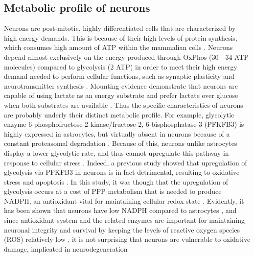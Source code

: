 \subsection{Metabolic profile of neurons}
Neurons are post-mitotic, highly differentiated cells that are characterized by high energy demands. This is because of their high levels of protein synthesis, which consumes high amount of ATP within the mammalian cells \citep{Buttgereit1995}. Neurons depend almost exclusively on the energy produced through OxPhos (30 - 34 ATP molecules) compared to glycolysis (2 ATP) in order to meet their high energy demand needed to perform cellular functions, such as synaptic plasticity and neurotransmitter synthesis \citep{Cenini2019,Mattson2008,Schonfeld2013}. Mounting evidence demonstrate that neurons are capable of using lactate as an energy substrate \citep{Boumezbeur2010,Bouzier2000,Serres2005} and prefer lactate over glucose when both substrates are available \citep{Bouzier-Sore2006,Itoh2003}. Thus the specific characteristics of neurons are probably underly their distinct metabolic profile. For example, glycolytic enzyme 6-phosphofructose-2-kinase/fructose-2, 6-bisphosphatase-3 (PFKFB3) is highly expressed in astrocytes, but virtually absent in neurons because of a constant proteasomal degradation \citep{Almeida2004,Herrero-Mendez2009}. Because of this, neurons unlike astrocytes display a lower glycolytic rate, and thus cannot upregulate this pathway in response to cellular stress \citep{Almeida2004,Herrero-Mendez2009}. Indeed, a previous study showed that upregulation of glycolysis via PFKFB3 in neurons is in fact detrimental, resulting to oxidative stress and apoptosis \citep{Herrero-Mendez2009}. In this study, it was though that the upregulation of glycolysis occurs at a cost of PPP metabolism that is needed to produce NADPH, an antioxidant vital for maintaining cellular redox state \citep{Herrero-Mendez2009}. Evidently, it has been shown that neurons have low NADPH compared to astrocytes \citep{Ben-Yoseph1996,Garcia-Nogales2003}, and since antioxidant system and the related enzymes are important for maintaining neuronal integrity and survival by keeping the levels of reactive oxygen species (ROS) relatively low \citep{Cenini2019}, it is not surprising that neurons are vulnerable to oxidative damage, implicated in neurodegeneration

